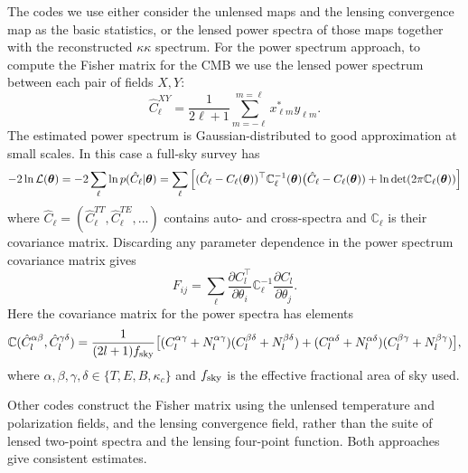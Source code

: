 The codes we use either consider the unlensed maps and the lensing convergence map as the basic statistics, or the lensed power spectra of those maps together with the reconstructed $\kappa \kappa$ spectrum. For the power spectrum approach, to compute the Fisher matrix for the CMB we use the lensed power spectrum between each pair of fields $X, Y$:
%
\begin{equation}
\label{eqEstimator}
\hat{C}^{XY}_\ell = \frac{1}{2\ell+1}\sum_{m=-\ell}^{m=\ell} x^{*}_{\ell m} y_{\ell m}.
\end{equation}
%
The estimated power spectrum is Gaussian-distributed to good approximation at small scales. In this case a full-sky survey has
%
\begin{equation}
-2\ln\mathcal{L}(\boldsymbol{\theta}) = -2\sum_\ell \ln p( \hat{C}_\ell | \boldsymbol{\theta}) \\
=  \sum_\ell  \Big[ (\hat{C}_\ell - C_\ell(\boldsymbol{\theta}) )^\top  \mathbb{C}^{-1}_\ell(\boldsymbol{\theta}) \big(\hat{C}_\ell - C_\ell(\boldsymbol{\theta})) + \ln \det(2 \pi \mathbb{C}_\ell(\boldsymbol{\theta})) \Big]
\end{equation}
%
where $ \hat{C}_\ell = (\hat{C}_\ell^{TT}, \hat{C}_\ell^{TE}, ...) $ contains auto- and cross-spectra and $\mathbb{C}_\ell$ is their covariance matrix. Discarding any parameter dependence in the power spectrum covariance matrix gives
%
\begin{equation}
F_{ij} = \sum_\ell \frac{\partial C^\top_l}{\partial \theta_i} \mathbb{C}^{-1}_\ell \frac{\partial C_l}{\partial \theta_j}.
\end{equation}
%
Here the covariance matrix for the power spectra has elements
%
\begin{equation}
\mathbb{C}(\hat{C}_l^{\alpha \beta}, \hat{C}_l^{\gamma \delta}) = \frac{1}{(2l+1)f_{\rm sky}} \big[ (C_l^{\alpha \gamma} + N_l^{\alpha \gamma}) (C_l^{\beta \delta} + N_l^{\beta \delta})  \\
+ (C_l^{\alpha \delta} + N_l^{\alpha \delta}) (C_l^{\beta \gamma} + N_l^{\beta \gamma}) \big],
\end{equation}
%
where $\alpha, \beta, \gamma, \delta \in \{T, E, B, \kappa_c\}$ and $f_{\rm sky}$ is the effective fractional area of sky used. 

Other codes construct the Fisher matrix using the unlensed temperature and polarization fields, and the lensing convergence field, rather than the suite of lensed two-point spectra and the lensing four-point function. Both approaches give consistent estimates.


